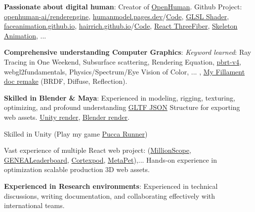 	\begin{onecolentry}
		\begin{highlightsforbulletentries}
			
			\item \textbf{Passionate about digital human}: Creator of \href{https://github.com/openhuman-ai}{OpenHuman}. Github Project: \href{https://github.com/openhuman-ai/renderengine}{openhuman-ai/renderengine}, \href{https://humanmodel.pages.dev}{humanmodel.pages.dev}/\href{https://github.com/openhuman-ai/humanmodel}{Code}, \href{https://github.com/openhuman-ai/renderengine/blob/main/test/vertex_full.glsl}{GLSL Shader}, \href{https://github.com/FaceAnimation/faceanimation.github.io/tree/main/src}{faceanimation.github.io}, \href{https://hairrich.github.io}{hairrich.github.io}/\href{https://github.com/hairrich/hairrich.github.io}{Code}, \href{https://hmthanh.github.io/CrossSphere}{React ThreeFiber}, \href{https://jumming.vercel.app/}{Skeleton Animation}, ...
			
			\item \textbf{Comprehensive understanding Computer Graphics}: \textit{Keyword learned}: Ray Tracing in One Weekend, Subsurface scattering, Rendering Equation, \href{https://github.com/hmthanh/pbrt-v4}{pbrt-v4}, webgl2fundamentals, Physics/Spectrum/Eye Vision of Color, ... ,  \href{https://mattergen.github.io}{My Fillament doc remake} (BRDF, Diffuse, Reflection).
			
			\item \textbf{Skilled in Blender \& Maya}: Experienced in modeling, rigging, texturing, optimizing, and profound understanding \href{https://github.com/hmthanh/glTF-Sample-Viewer}{GLTF JSON} Structure for exporting web assets. \href{https://www.youtube.com/@openhuman_ai}{Unity render}, \href{https://www.instagram.com/p/DKMV3xwJcQm}{Blender render}. 
			
			Skilled in Unity (Play my game \href{https://hmthanh.github.io/pucca_runner/}{Pucca Runner})
			
			Vast experience of multiple React web project: (\href{https://millionscope.com}{MillionScope}, \href{https://github.com/genealeaderboard/genealeaderboard.github.io}{GENEALeaderboard}, \href{https://cortexpod.com}{Cortexpod}, \href{https://metapet.vercel.app}{MetaPet}),...
			Hands-on experience in optimization scalable production 3D web assets. 
			
			\item \textbf{Experienced in Research environments}: Experienced in technical discussions, writing documentation, and collaborating effectively with international teams.
			
		\end{highlightsforbulletentries}
	\end{onecolentry}
	
	
	
	
	